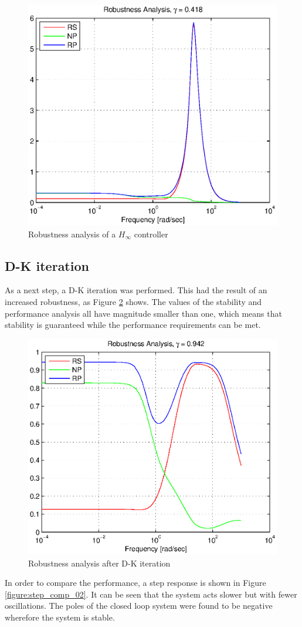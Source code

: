 \documentclass[conference]{IEEEtran}
\begin{document}
\begin{figure}[h]
\centering
  \includegraphics[width=.47\textwidth]{pics/RP_before_DK} 
  \caption{Robustness analysis of a $H_{\infty}$ controller}  
  \label{figure:RP_before_DK}
\end{figure}



\subsection{D-K iteration}

As a next step, a D-K iteration was performed. This had the result of an increased robustness, as Figure \ref{figure:RP_after_DK} shows. The values of the stability and performance analysis all have magnitude smaller than one, which means that stability is guaranteed while the performance requirements can be met.

\begin{figure}[h]
\centering
  \includegraphics[width=.47\textwidth]{pics/RP_after_DK} 
  \caption{Robustness analysis after D-K iteration}  
  \label{figure:RP_after_DK}
\end{figure}

In order to compare the performance, a step response is shown in Figure \ref{figure:step_comp_02}. It can be seen that the system acts slower but with fewer oscillations. The poles of the closed loop system were found to be negative wherefore the system is stable.
\end{document}
